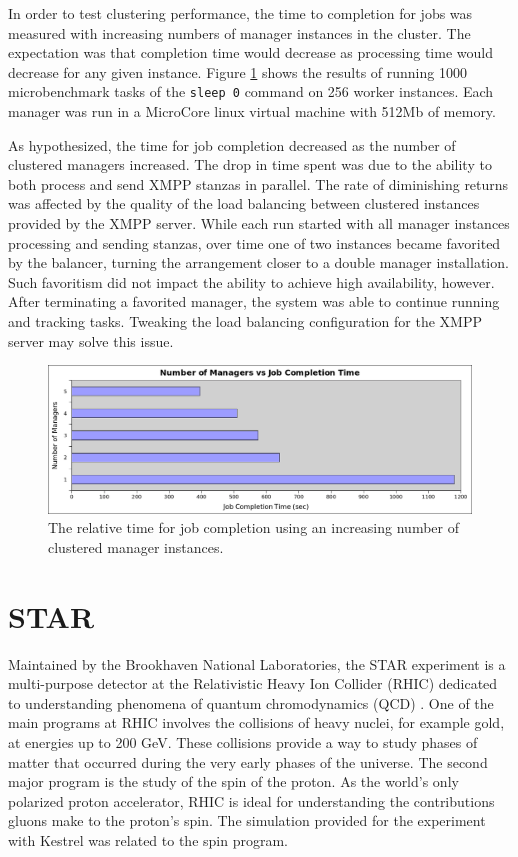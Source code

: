 In order to test clustering performance, the time to completion for
jobs was measured with increasing numbers of manager instances in
the cluster. The expectation was that completion time would decrease
as processing time would decrease for any given instance. Figure
\ref{fig:Clustering} shows the results of running 1000 microbenchmark
tasks of the \texttt{sleep 0} command on 256 worker instances. Each
manager was run in a MicroCore linux virtual machine with 512Mb of
memory.

As hypothesized, the time for job completion decreased as the number
of clustered managers increased. The drop in time spent was due to
the ability to both process and send XMPP stanzas in parallel. The rate of
diminishing returns was affected by the quality of the load balancing
between clustered instances provided by the XMPP server. While each run
started with all manager instances processing and sending stanzas, over time
one of two instances became favorited by the balancer, turning the arrangement
closer to a double manager installation. Such favoritism did not impact the
ability to achieve high availability, however. After terminating a favorited manager,
the system was able to continue running and tracking tasks. Tweaking the load
balancing configuration for the XMPP server may solve this issue.

\begin{figure}
\label{fig:Clustering}
\includegraphics[width=\columnwidth]{figures/clustering}
\caption{The relative time for job completion using an increasing number
of clustered manager instances.}
\end{figure}

\section{STAR}
\label{sec:STAR} Maintained by the Brookhaven National Laboratories,
the STAR experiment is a multi-purpose detector at the Relativistic
Heavy Ion Collider (RHIC) dedicated to understanding phenomena of
quantum chromodynamics (QCD) \cite{STAR}. One of the main programs
at RHIC involves the collisions of heavy nuclei, for example gold,
at energies up to 200 GeV. These collisions provide a way to study
phases of matter that occurred during the very early phases of the
universe. The second major program is the study of the spin of the
proton. As the world's only polarized proton accelerator, RHIC is
ideal for understanding the contributions gluons make to the proton's
spin. The simulation provided for the experiment with Kestrel was
related to the spin program.


